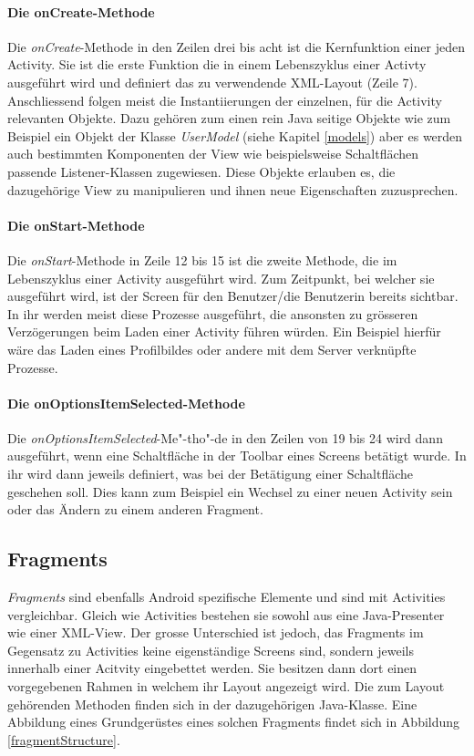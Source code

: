 \documentclass[../main.tex]{subfiles}
\begin{document}
	\paragraph{Die onCreate-Methode}
	Die \emph{onCreate}-Methode in den Zeilen drei bis acht ist die Kernfunktion einer jeden Activity. Sie ist die erste Funktion die in einem Lebenszyklus einer Activty ausgeführt wird und definiert das zu verwendende XML-Layout (Zeile 7). Anschliessend folgen meist die Instantiierungen der einzelnen, für die Activity relevanten Objekte. Dazu gehören zum einen rein Java seitige Objekte wie zum Beispiel ein Objekt der Klasse \emph{UserModel} (siehe Kapitel \ref{models}) aber es werden auch bestimmten Komponenten der View wie beispielsweise Schaltflächen passende Listener-Klassen zugewiesen. Diese Objekte erlauben es, die dazugehörige View zu manipulieren und ihnen neue Eigenschaften zuzusprechen.

	\paragraph{Die onStart-Methode}
	Die \emph{onStart}-Methode in Zeile 12 bis 15 ist die zweite Methode, die im Lebenszyklus einer Activity ausgeführt wird. Zum Zeitpunkt, bei welcher sie ausgeführt wird, ist der Screen für den Benutzer/die Benutzerin bereits sichtbar. In ihr werden meist diese Prozesse ausgeführt, die ansonsten zu grösseren Verzögerungen beim Laden einer Activity führen würden. Ein Beispiel hierfür wäre das Laden eines Profilbildes oder andere mit dem Server verknüpfte Prozesse.
	
	\paragraph{Die onOptionsItemSelected-Methode} 
	\sloppy
	Die \emph{onOptionsItemSelected}-Me"-tho"-de in den Zeilen von 19 bis 24 wird dann ausgeführt, wenn eine Schaltfläche in der Toolbar eines Screens betätigt wurde. In ihr wird dann jeweils definiert, was bei der Betätigung einer Schaltfläche geschehen soll. Dies kann zum Beispiel ein Wechsel zu einer neuen Activity sein oder das Ändern zu einem anderen Fragment.
	\fussy
	
	\subsection{Fragments}
	\emph{Fragments} sind ebenfalls Android spezifische Elemente und sind mit Activities vergleichbar. Gleich wie Activities bestehen sie sowohl aus eine Java-Presenter wie einer XML-View. Der grosse Unterschied ist jedoch, das Fragments im Gegensatz zu Activities keine eigenständige Screens sind, sondern jeweils innerhalb einer Acitvity eingebettet werden. Sie besitzen dann dort einen vorgegebenen Rahmen in welchem ihr Layout angezeigt wird. Die zum Layout gehörenden Methoden finden sich in der dazugehörigen Java-Klasse. Eine Abbildung eines Grundgerüstes eines solchen Fragments findet sich in Abbildung \ref{fragmentStructure}.
	
\end{document}
